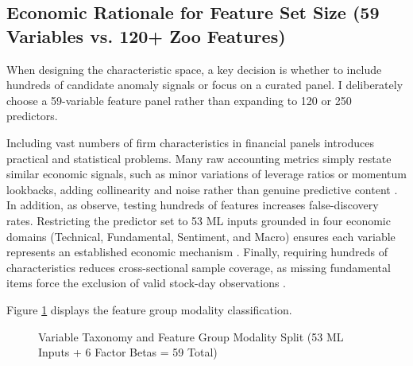\subsection{Economic Rationale for Feature Set Size (59 Variables vs. 120+ Zoo Features)}
When designing the characteristic space, a key decision is whether to include hundreds of candidate anomaly signals or focus on a curated panel. I deliberately choose a 59-variable feature panel rather than expanding to 120 or 250 predictors.

Including vast numbers of firm characteristics in financial panels introduces practical and statistical problems. Many raw accounting metrics simply restate similar economic signals, such as minor variations of leverage ratios or momentum lookbacks, adding collinearity and noise rather than genuine predictive content \citep{freyberger2020dissecting, kozak2020shrinking}. In addition, as \citet{harvey2016and} observe, testing hundreds of features increases false-discovery rates. Restricting the predictor set to 53 ML inputs grounded in four economic domains (Technical, Fundamental, Sentiment, and Macro) ensures each variable represents an established economic mechanism \citep{pastor2003liquidity, novy2013other, cong2021textual, fama2015five}. Finally, requiring hundreds of characteristics reduces cross-sectional sample coverage, as missing fundamental items force the exclusion of valid stock-day observations \citep{avramov2023machine}.

Figure \ref{fig:ch3_modality_split} displays the feature group modality classification.

\begin{figure}[htbp]
\centering
{}
\caption{Variable Taxonomy and Feature Group Modality Split (53 ML Inputs + 6 Factor Betas = 59 Total)}
\label{fig:ch3_modality_split}
\end{figure}

